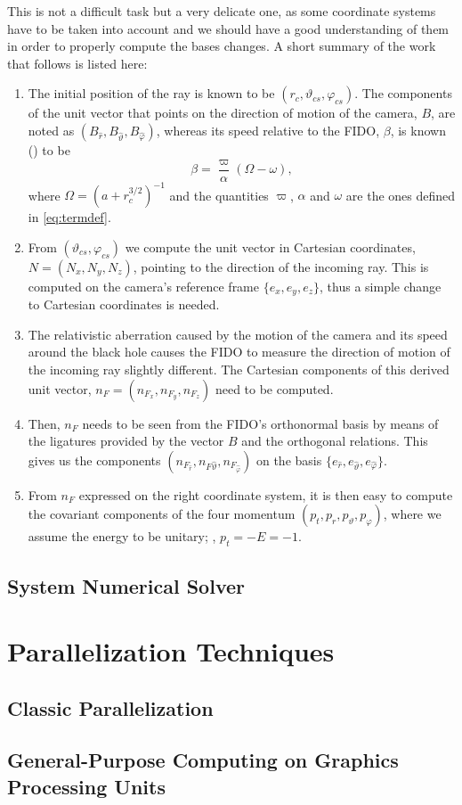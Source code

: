 This is not a difficult task but a very delicate one, as some coordinate systems have to be taken into account and we should have a good understanding of them in order to properly compute the bases changes. A short summary of the work that follows is listed here:
\begin{enumerate}
	\item The initial position of the ray is known to be $(r_c, \vartheta_{cs}, \varphi_{cs})$. The components of the unit vector that points on the direction of motion of the camera, $B$, are noted as $(B_{\widehat{r}}, B_{\widehat{\vartheta}}, B_{\widehat{\varphi}})$, whereas its speed relative to the FIDO, $\beta$, is known (\cite[A.7]{thorne15}) to be
	\[
		\beta = \frac{\varpi}{\alpha}(\Omega - \omega),
	\]
	where $\Omega = \left( a + r_c^{3/2} \right)^{-1}$ and the quantities $\varpi$, $\alpha$ and $\omega$ are the ones defined in \autoref{eq:termdef}.
	\item From $(\vartheta_{cs}, \varphi_{cs})$ we compute the unit vector in Cartesian coordinates, $N = (N_x, N_y, N_z)$, pointing to the direction of the incoming ray. This is computed on the camera's reference frame $\{e_x, e_y, e_z\}$, thus a simple change to Cartesian coordinates is needed.
	\item The relativistic aberration caused by the motion of the camera and its speed around the black hole causes the FIDO to measure the direction of motion of the incoming ray slightly different. The Cartesian components of this derived unit vector, $n_F = (n_{F_x}, n_{F_y}, n_{F_z})$ need to be computed.
	\item Then, $n_F$ needs to be seen from the FIDO's orthonormal basis by means of the ligatures provided by the vector $B$ and the orthogonal relations. This gives us the components $(n_{F_{\widehat{r}}}, n_{F{\widehat{\vartheta}}}, n_{F_{\widehat{\varphi}}})$ on the basis $\{e_{\widehat{r}}, e_{\widehat{\vartheta}}, e_{\widehat{\varphi}}\}$.
	\item From $n_F$ expressed on the right coordinate system, it is then easy to compute the covariant components of the four momentum $(p_t, p_r, p_\vartheta, p_\varphi)$, where we assume the energy to be unitary; \ie, $p_t = -E = -1$.
\end{enumerate}


\subsection{System Numerical Solver}



\section{Parallelization Techniques}
\subsection{Classic Parallelization}
\subsection{General-Purpose Computing on Graphics Processing Units}